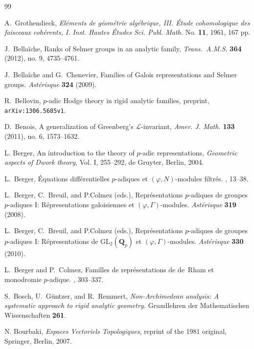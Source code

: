 \documentclass[12pt]{article}
\theoremstyle{definition}
\numberwithin{equation}{theorem}
\begin{document}
\begin{thebibliography}{99}

A.~Grothendieck, \textit{El\'ements de g\'eom\'etrie alg\'ebrique, III. \'Etude cohomologique des faisceaux coh\'erents, I.} \textit{Inst. Hautes \'Etudes Sci. Publ. Math.} No. \textbf{11}, 1961, 167 pp.

 J.~Bella\"iche, Ranks of Selmer groups in an
  analytic family, {\it Trans.~A.M.S.} {\bf 364} (2012), no. 9,
  4735--4761.

 J.~Bella\"iche and G.~Chenevier,
  Families of Galois representations and Selmer groups.  {\it
    Ast\'erisque} {\bf 324} (2009).

 R.~Bellovin, $p$-adic Hodge theory in rigid
  analytic families, preprint, \texttt{arXiv:1306.5685v1}.

 D.~Benois, A generalization of Greenberg's
  $\mathcal{L}$-invariant, \textit{Amer. J. Math.} {\bf 133} (2011),
  no. 6, 1573--1632.

 L. Berger, An introduction to the theory of $p$-adic representations, \textit{Geometric aspects of Dwork theory}, Vol. I, 255--292, de Gruyter, Berlin, 2004.

L.~Berger, \'Equations diff\'erentielles $p$-adiques et $(\varphi,
N)$-modules filtr\'es. \cite{R:Ast}, 13--38.

 L.~Berger, C.~Breuil, and P.Colmez (eds.),
  Repr\'esentations $p$-adiques de groupes $p$-adiques I:
  R\'epresentations galoisiennes et $(\varphi,\Gamma)$-modules.  {\it
    Ast\'erisque} {\bf 319} (2008).

 L.~Berger, C.~Breuil, and P.Colmez (eds.),
  Repr\'esentations $p$-adiques de groupes $p$-adiques I:
  R\'epresentations de $\mathrm{GL}_2(\mathbf{Q}_p)$ et
  $(\varphi,\Gamma)$-modules.  {\it Ast\'erisque} {\bf 330} (2010).

 L.~Berger and P.~Colmez, Familles de
  repr\'esentations de de~Rham et monodromie $p$-adique.
  \cite{R:Ast}, 303--337.

 S.~Bosch, U.~G\"untzer, and R.~Remmert, {\it
  Non-Archimedean analysis: A systematic approach to rigid analytic
  geometry.}  Grundlehren der Mathematischen Wissenschaften {\bf 261}.

N. Bourbaki, \textit{Espaces Vectoriels Topologiques}, reprint of the 1981 original, Springer,
Berlin, 2007.


\end{thebibliography}
\end{document}
